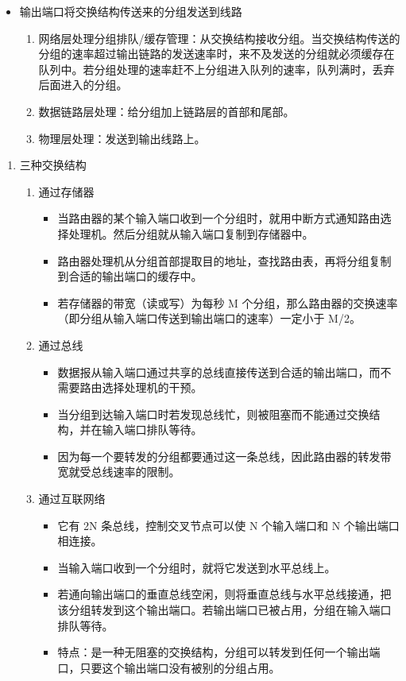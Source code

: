 \documentclass[11pt]{article}
\begin{document}
\begin{enumerate}
\begin{enumerate}
\begin{itemize}
\item 输出端口将交换结构传送来的分组发送到线路
\begin{enumerate}
\item 网络层处理分组排队/缓存管理：从交换结构接收分组。当交换结构传送的分组的速率超过输出链路的发送速率时，来不及发送的分组就必须缓存在队列中。若分组处理的速率赶不上分组进入队列的速率，队列满时，丢弃后面进入的分组。
\item 数据链路层处理：给分组加上链路层的首部和尾部。
\item 物理层处理：发送到输出线路上。
\end{enumerate}
\end{itemize}
\begin{enumerate}
\item 三种交换结构
\label{sec:org2249a2e}
\begin{enumerate}
\item 通过存储器
\begin{itemize}
\item 当路由器的某个输入端口收到一个分组时，就用中断方式通知路由选择处理机。然后分组就从输入端口复制到存储器中。
\item 路由器处理机从分组首部提取目的地址，查找路由表，再将分组复制到合适的输出端口的缓存中。
\item 若存储器的带宽（读或写）为每秒 M 个分组，那么路由器的交换速率（即分组从输入端口传送到输出端口的速率）一定小于 M/2。
\end{itemize}
\item 通过总线
\begin{itemize}
\item 数据报从输入端口通过共享的总线直接传送到合适的输出端口，而不需要路由选择处理机的干预。
\item 当分组到达输入端口时若发现总线忙，则被阻塞而不能通过交换结构，并在输入端口排队等待。
\item 因为每一个要转发的分组都要通过这一条总线，因此路由器的转发带宽就受总线速率的限制。
\end{itemize}
\item 通过互联网络
\begin{itemize}
\item 它有 2N 条总线，控制交叉节点可以使 N 个输入端口和 N 个输出端口相连接。
\item 当输入端口收到一个分组时，就将它发送到水平总线上。
\item 若通向输出端口的垂直总线空闲，则将垂直总线与水平总线接通，把该分组转发到这个输出端口。若输出端口已被占用，分组在输入端口排队等待。
\item 特点：是一种无阻塞的交换结构，分组可以转发到任何一个输出端口，只要这个输出端口没有被别的分组占用。

\end{itemize}
\end{enumerate}
\end{enumerate}
\end{enumerate}
\end{enumerate}
\end{document}
